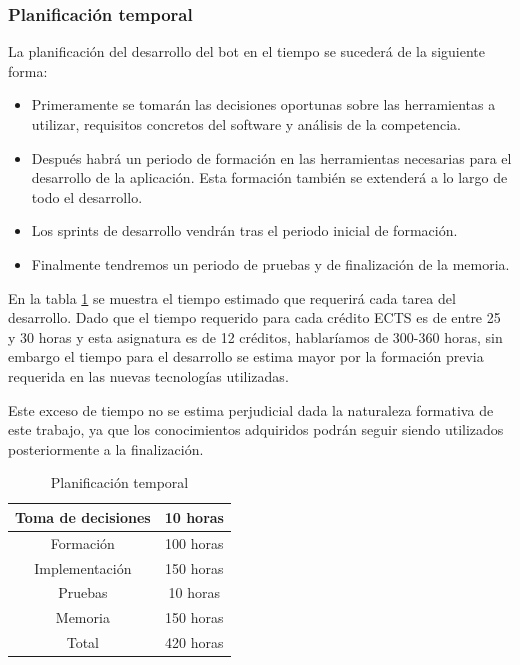 \subsubsection{Planificación temporal}

La planificación del desarrollo del bot en el tiempo se sucederá de la siguiente forma:

\begin{itemize}
    \item Primeramente se tomarán las decisiones oportunas sobre las herramientas a utilizar, requisitos concretos del software y análisis de la competencia.
    \item Después habrá un periodo de formación en las herramientas necesarias para el desarrollo de la aplicación. Esta formación también se extenderá a lo largo de todo el desarrollo.
    \item Los sprints de desarrollo vendrán tras el periodo inicial de formación.
    \item Finalmente tendremos un periodo de pruebas y de finalización de la memoria.
\end{itemize}

En la tabla \ref{tab:planificacionTemporal} se muestra el tiempo estimado que requerirá cada tarea del desarrollo. Dado que el tiempo requerido para cada crédito ECTS es de entre 25 y 30 horas y esta asignatura es de 12 créditos, hablaríamos de 300-360 horas, sin embargo el tiempo para el desarrollo se estima mayor por la formación previa requerida en las nuevas tecnologías utilizadas. 

Este exceso de tiempo no se estima perjudicial dada la naturaleza formativa de este trabajo, ya que los conocimientos adquiridos podrán seguir siendo utilizados posteriormente a la finalización.

\begin{table}[]
    \centering
    \begin{tabular}{|c|c|}
        \hline
        Toma de decisiones & 10 horas \\
        \hline
        Formación   & 100 horas \\
        \hline
        Implementación & 150 horas \\
        \hline
        Pruebas & 10 horas \\
        \hline
        Memoria & 150 horas \\
        \hline
        \hline
        Total & 420 horas \\
        \hline
    \end{tabular}
    \caption{Planificación temporal}
    \label{tab:planificacionTemporal}
\end{table}


